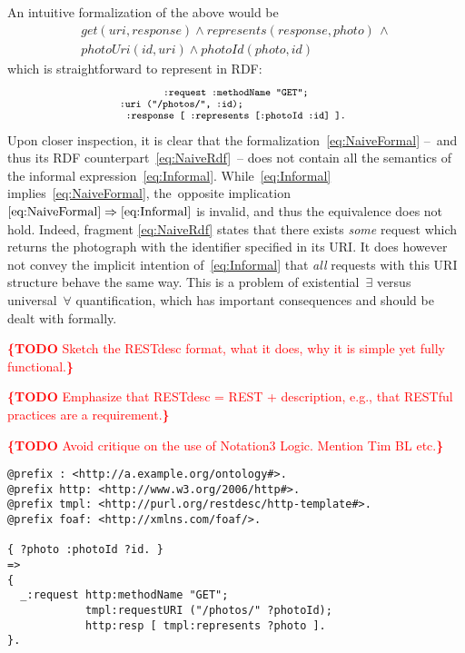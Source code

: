 \documentclass[runningheads,a4paper, twocolumn]{llncs}
\newcommand{\todo}[1]{\noindent\textcolor{red}{{\bf \{TODO} #1{\bf \}}}}
\begin{document}
\noindent An intuitive formalization of the above would be
\begin{multline}\label{eq:NaiveFormal}
	get(uri, response) \land represents(response, photo)\, \land \\[-.3em]
	photoUri(id, uri) \land photoId(photo,id)
\end{multline}
which is straightforward to represent in RDF:
\begin{multline}\label{eq:NaiveRdf}
	{\fontsize{8}{10}\texttt{:request :methodName "GET";}} \\[-.6em]
	\fontsize{8}{10}\texttt{:uri ("/photos/", :id);}\makebox[3.03cm]{} \\[-.6em]
	\fontsize{8}{10}\texttt{:response [ :represents [:photoId :id] ].}
\end{multline}
Upon closer inspection, it is clear that the formalization~\ref{eq:NaiveFormal} --~and thus its RDF counterpart~\ref{eq:NaiveRdf}~-- does not contain all the semantics of the informal expression~\ref{eq:Informal}. While~\ref{eq:Informal} implies~\ref{eq:NaiveFormal}, the~opposite implication \mbox{$\ref{eq:NaiveFormal} \Rightarrow \ref{eq:Informal}$} is invalid, and thus the equivalence does not hold. Indeed, fragment \ref{eq:NaiveRdf} states that there exists \emph{some} request which returns the photograph with the identifier specified in its URI. It does however not convey the implicit intention of~\ref{eq:Informal} that \emph{all} requests with this URI structure behave the same way. This is a problem of existential~$\exists$ versus universal~$\forall$ quantification, which has important consequences and should be dealt with formally.

\todo{Sketch the RESTdesc format, what it does, why it is simple yet fully functional.}

\todo{Emphasize that RESTdesc = REST + description, e.g., that RESTful practices are a requirement.}

\todo{Avoid critique on the use of Notation3 Logic. Mention Tim BL etc.}


\begin{lstlisting}[caption=RESTdesc description of photo retrieval,
                   label=lst:PhotoGet, float, escapechar=§]
@prefix : <http://a.example.org/ontology#>.
@prefix http: <http://www.w3.org/2006/http#>.
@prefix tmpl: <http://purl.org/restdesc/http-template#>.
@prefix foaf: <http://xmlns.com/foaf/>.

{ ?photo :photoId ?id. }
=>
{
  _:request http:methodName "GET";
            tmpl:requestURI ("/photos/" ?photoId);
            http:resp [ tmpl:represents ?photo ].
}.
\end{lstlisting}
\end{document}

